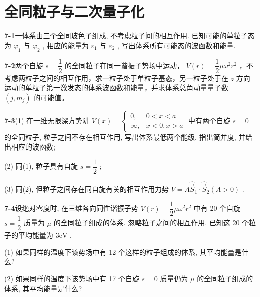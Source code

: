 \chapter{全同粒子与二次量子化}

\newpage


\textbf{7-1}\quad 一体系由三个全同玻色子组成, 不考虑粒子间的相互作用. 已知可能的单粒子态为 $\displaystyle \varphi_{1}$ 与 $\displaystyle \varphi_{2}$ , 相应的能量为 $\displaystyle \varepsilon_{1}$ 与 $\displaystyle \varepsilon_{2}$ , 写出体系所有可能态的波函数和能量.

\vfill

\newpage

\textbf{7-2}\quad 两个自旋 $\displaystyle s = \dfrac{1}{2}$ 的全同粒子在同一谐振子势场中运动， $\displaystyle V(r) = \dfrac{1}{2}\mu \omega^2 r^2$ ，不考虑两粒子之间的相互作用，求一粒子处于单粒子基态，另一粒子处于在 $\displaystyle z$ 方向运动的单粒子第一激发态的体系波函数和能量，并求体系总角动量量子数 $\displaystyle (j, m_j)$ 的可能值。

\vfill

\newpage

\textbf{7-3}\quad (1) 在一维无限深方势阱 $\displaystyle V(x) = \begin{cases} 0, & 0 < x < a \\ \infty, & x < 0, x > a \end{cases}$ 中有两个自旋 $\displaystyle s = 0$ 的全同粒子, 粒子之间不存在相互作用, 写出体系最低两个能级, 指出简并度, 并给出相应的波函数;

(2) 同(1), 粒子具有自旋 $\displaystyle s = \dfrac{1}{2}$ ;

(3) 同(2), 但粒子之间存在同自旋有关的相互作用力势 $\displaystyle V = A\hat{\vec{S}}_1 \cdot \hat{\vec{S}}_2 (A > 0)$ .

\vfill

\newpage

\textbf{7-4}\quad 设绝对零度时, 在三维各向同性谐振子势 $\displaystyle V(r) = \dfrac{1}{2}\mu \omega^2 r^2$ 中有 20 个自旋 $\displaystyle s = \dfrac{1}{2}$ 质量为 $\displaystyle \mu$ 的全同粒子组成的体系. 忽略粒子之间的相互作用. 已知这 20 个粒子的平均能量为 $\displaystyle 3\mathrm{eV}$ .

(1) 如果同样的温度下该势场中有 12 个这样的粒子组成的体系, 其平均能量是什么?

(2) 如果同样的温度下该势场中有 17 个自旋 $\displaystyle s = 0$ 质量仍为 $\displaystyle \mu$ 的全同粒子组成的体系, 其平均能量是什么?

\vfill

